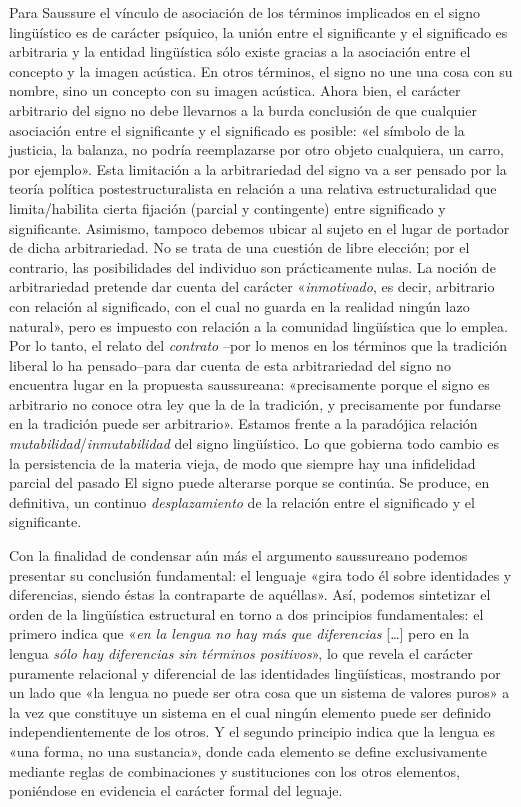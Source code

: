 Para Saussure el vínculo de asociación de los términos implicados en el signo lingüístico es de carácter psíquico, la unión entre el significante y el significado es arbitraria y la entidad lingüística sólo existe gracias a la asociación entre el concepto y la imagen acústica. En otros términos, el signo no une una cosa con su nombre, sino un concepto con su imagen acústica. Ahora bien, el carácter arbitrario del signo no debe llevarnos a la burda conclusión de que cualquier asociación entre el significante y el significado es posible: «el símbolo de la justicia, la balanza, no podría reemplazarse por otro objeto cualquiera, un carro, por ejemplo». Esta limitación a la arbitrariedad del signo va a ser pensado por la teoría política postestructuralista en relación a una relativa estructuralidad que limita/habilita cierta fijación (parcial y contingente) entre significado y significante. Asimismo, tampoco debemos ubicar al sujeto en el lugar de portador de dicha arbitrariedad. No se trata de una cuestión de libre elección; por el contrario, las posibilidades del individuo son prácticamente nulas. La noción de arbitrariedad pretende dar cuenta del carácter «\emph{inmotivado}, es decir, arbitrario con relación al significado, con el cual no guarda en la realidad ningún lazo natural», pero es impuesto con relación a la comunidad lingüística que lo emplea. Por lo tanto, el relato del \emph{contrato} --por lo menos en los términos que la tradición liberal lo ha pensado--para dar cuenta de esta arbitrariedad del signo no encuentra lugar en la propuesta saussureana: «precisamente porque el signo es arbitrario no conoce otra ley que la de la tradición, y precisamente por fundarse en la tradición puede ser arbitrario». Estamos frente a la paradójica relación \emph{mutabilidad}/\emph{inmutabilidad} del signo lingüístico. Lo que gobierna todo cambio es la persistencia de la materia vieja, de modo que siempre hay una infidelidad parcial del pasado El signo puede alterarse porque se continúa. Se produce, en definitiva, un continuo \emph{desplazamiento} de la relación entre el significado y el significante.

Con la finalidad de condensar aún más el argumento saussureano podemos presentar su conclusión fundamental: el lenguaje «gira todo él sobre identidades y diferencias, siendo éstas la contraparte de aquéllas». Así, podemos sintetizar el orden de la lingüística estructural en torno a dos principios fundamentales: el primero indica que «\emph{en la lengua no hay más que diferencias} {[}\ldots{]} pero en la lengua \emph{sólo hay diferencias sin términos positivos}», lo que revela el carácter puramente relacional y diferencial de las identidades lingüísticas, mostrando por un lado que «la lengua no puede ser otra cosa que un sistema de valores puros» a la vez que constituye un sistema en el cual ningún elemento puede ser definido independientemente de los otros. Y el segundo principio indica que la lengua es «una forma, no una sustancia», donde cada elemento se define exclusivamente mediante reglas de combinaciones y sustituciones con los otros elementos, poniéndose en evidencia el carácter formal del leguaje.

